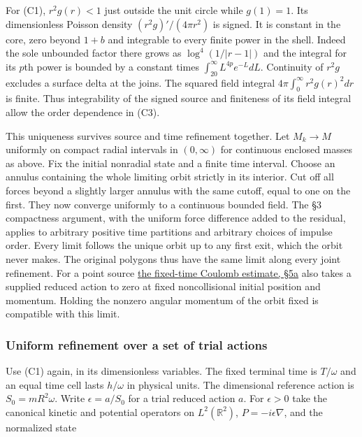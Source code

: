 \documentclass[11pt,a4paper]{article}
\begin{document}
For (C1), \(r^2g(r)<1\) just outside the unit circle while \(g(1)=1\).
Its dimensionless Poisson density \((r^2g)'/(4\pi r^2)\) is signed. It
is constant in the core, zero beyond \(1+b\) and integrable to every
finite power in the shell. Indeed the sole unbounded factor there grows
as \(\log^4(1/|r-1|)\) and the integral for its \(p\)th power is bounded
by a constant times \(\int_{20}^{\infty} L^{4p}e^{-L}dL\). Continuity of
\(r^2g\) excludes a surface delta at the joins. The squared field
integral \(4\pi\int_0^\infty r^2g(r)^2dr\) is finite. Thus integrability
of the signed source and finiteness of its field integral allow the
order dependence in (C3).

This uniqueness survives source and time refinement together. Let
\(M_k\to M\) uniformly on compact radial intervals in \((0,\infty)\) for
continuous enclosed masses as above. Fix the initial nonradial state and
a finite time interval. Choose an annulus containing the whole limiting
orbit strictly in its interior. Cut off all forces beyond a slightly
larger annulus with the same cutoff, equal to one on the first. They now
converge uniformly to a continuous bounded field. The §3 compactness
argument, with the uniform force difference added to the residual,
applies to arbitrary positive time partitions and arbitrary choices of
impulse order. Every limit follows the unique orbit up to any first
exit, which the orbit never makes. The original polygons thus have the
same limit along every joint refinement. For a point source
\href{self-sufficiency-contrast.md}{the fixed-time Coulomb estimate,
§5a} also takes a supplied reduced action to zero at fixed
noncollisional initial position and momentum. Holding the nonzero
angular momentum of the orbit fixed is compatible with this limit.

\subsubsection{Uniform refinement over a set of trial
actions}\label{uniform-refinement-over-a-set-of-trial-actions}

Use (C1) again, in its dimensionless variables. The fixed terminal time
is \(T/\omega\) and an equal time cell lasts \(h/\omega\) in physical
units. The dimensional reference action is \(S_0=mR^2\omega\). Write
\(\epsilon=a/S_0\) for a trial reduced action \(a\). For \(\epsilon>0\)
take the canonical kinetic and potential operators on
\(L^2(\mathbb R^2)\), \(P=-i\epsilon\nabla\), and the normalized state
\end{document}
